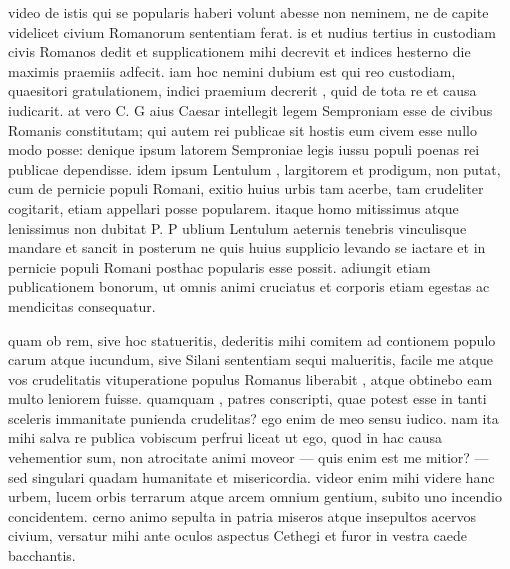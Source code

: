  video de istis qui se popularis haberi volunt abesse non neminem, ne de capite videlicet civium Romanorum sententiam ferat. is et nudius tertius in custodiam civis Romanos dedit et supplicationem mihi decrevit et indices hesterno die maximis praemiis adfecit. iam hoc nemini dubium est qui reo custodiam, quaesitori gratulationem, indici praemium decrerit , quid de tota re et causa iudicarit. at vero C. G aius Caesar intellegit legem Semproniam esse de civibus Romanis constitutam; qui autem rei publicae sit hostis eum civem esse nullo modo posse: denique ipsum latorem Semproniae legis iussu populi poenas rei publicae dependisse. idem ipsum Lentulum , largitorem et prodigum, non putat, cum de pernicie populi Romani, exitio huius urbis tam acerbe, tam crudeliter cogitarit, etiam appellari posse popularem. itaque homo mitissimus atque lenissimus non dubitat P. P ublium Lentulum aeternis tenebris vinculisque mandare et sancit in posterum ne quis huius supplicio levando se iactare et in pernicie populi Romani posthac popularis esse possit. adiungit etiam publicationem bonorum, ut omnis animi cruciatus et corporis etiam egestas ac mendicitas consequatur.

 quam ob rem, sive hoc statueritis, dederitis mihi comitem ad contionem populo carum atque iucundum, sive Silani sententiam sequi malueritis, facile me atque vos crudelitatis vituperatione populus Romanus liberabit , atque obtinebo eam multo leniorem fuisse. quamquam , patres conscripti, quae potest esse in tanti sceleris immanitate punienda crudelitas? ego enim de meo sensu iudico. nam ita mihi salva re publica vobiscum perfrui liceat ut ego, quod in hac causa vehementior sum, non atrocitate animi moveor — quis enim est me mitior? — sed singulari quadam humanitate et misericordia. videor enim mihi videre hanc urbem, lucem orbis terrarum atque arcem omnium gentium, subito uno incendio concidentem. cerno animo sepulta in patria miseros atque insepultos acervos civium, versatur mihi ante oculos aspectus Cethegi et furor in vestra caede bacchantis.

